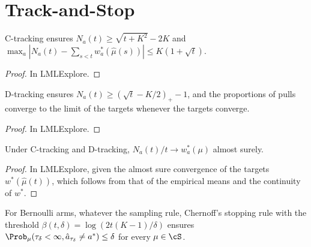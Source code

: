 \chapter{Track-and-Stop}
\label{chap:tas}

\begin{lemma}[{\cite[Lemma 7]{GK16}}]
  \label{lem:ctracking}
  \leanok
  C-tracking ensures $N_a(t) \ge \sqrt{t + K^2} - 2K$ and
  $\max_a |N_a(t) - \sum_{s < t} w^*_a(\hat\mu(s))| \le K(1 + \sqrt t)$.
\end{lemma}

\begin{proof}
  \leanok
  In LMLExplore.
\end{proof}

\begin{lemma}[{\cite[Lemma 8]{GK16}}]
  \label{lem:dtracking}
  \leanok
  D-tracking ensures $N_a(t) \ge (\sqrt t - K/2)_+ - 1$, and the proportions of pulls converge to
  the limit of the targets whenever the targets converge.
\end{lemma}

\begin{proof}
  \leanok
  In LMLExplore.
\end{proof}

\begin{proposition}[{\cite[Proposition 9]{GK16}}]
  \label{prop:convergence}
  \leanok
  Under C-tracking and D-tracking, $N_a(t)/t \to w^*_a(\mu)$ almost surely.
\end{proposition}

\begin{proof}
  \leanok
  In LMLExplore, given the almost sure convergence of the targets $w^*(\hat\mu(t))$, which
  follows from that of the empirical means and the continuity of $w^*$.
\end{proof}

\begin{theorem}[{\cite[Theorem 10]{GK16}}]
  \label{thm:kt}
  \leanok
  For Bernoulli arms, whatever the sampling rule, Chernoff's stopping rule with the threshold
  $\beta(t, \delta) = \log(2t(K-1)/\delta)$ ensures
  $\Prob_\mu(\tau_\delta < \infty, \hat a_{\tau_\delta} \ne a^*) \le \delta$ for every $\mu \in \cS$.
\end{theorem}

